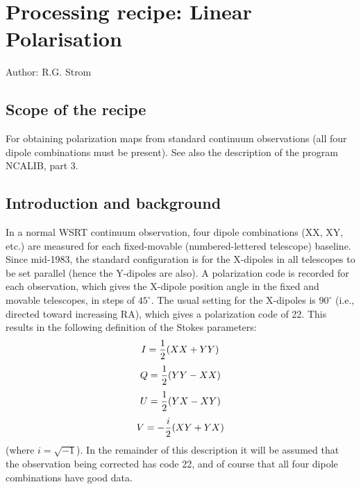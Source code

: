 %
%
\chapter{Processing recipe: Linear Polarisation}

Author: R.G. Strom 


\tableofcontents

\section{Scope of the recipe}
\label{.scope}


For obtaining polarization maps from standard continuum observations (all four
dipole combinations must be present). See also the description of the program
NCALIB, part 3.




\section{Introduction and background}
\label{.intro}

In a normal WSRT continuum observation, four dipole combinations (XX, XY, etc.)
are measured for each fixed-movable (numbered-lettered telescope) baseline.
Since mid-1983, the standard configuration is for the X-dipoles in all
telescopes to be set parallel (hence the Y-dipoles are also). A polarization
code is recorded for each observation, which gives the X-dipole position angle
in the fixed and movable telescopes, in steps of $45^\circ$. The usual setting
for the X-dipoles is $90^\circ$ (i.e., directed toward increasing RA), which
gives a polarization code of 22. This results in the following definition of
the Stokes parameters: $$I={1\over2}(XX+YY)$$ $$Q={1\over2}(YY-XX)$$
$$U={1\over2}(YX-XY)$$ $$V=-{i\over2}(XY+YX)$$ (where $i=\sqrt{-1}$). In the
remainder of this description it will be assumed that the observation being
corrected has code 22, and of course that all four dipole combinations have
good data.

